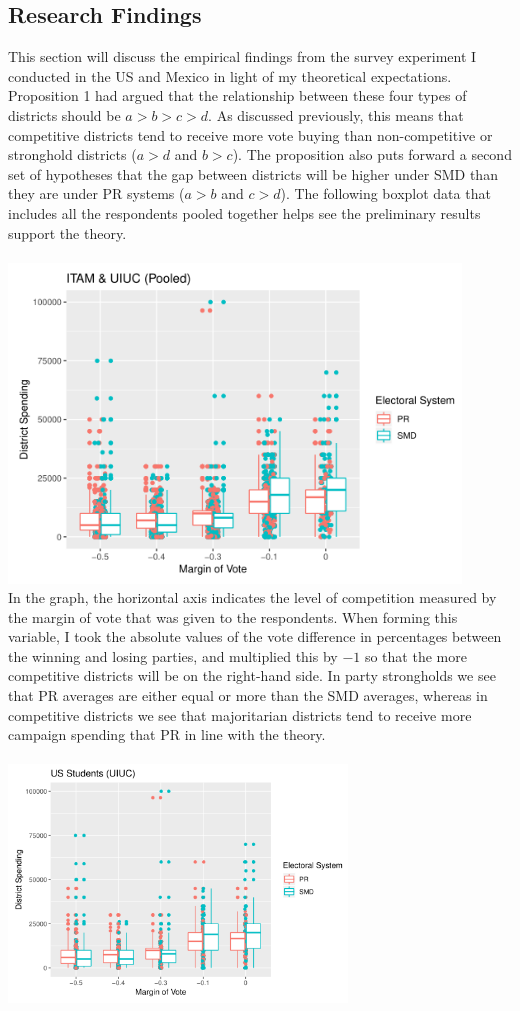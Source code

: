 \documentclass{article}
\begin{document}
\subsection{Research Findings}
This section will discuss the empirical findings from the survey experiment I conducted in the US and Mexico in light of my theoretical expectations. Proposition 1 had argued that the relationship between these four types of districts should be $a>b>c>d$. As discussed previously, this means that competitive districts tend to receive more vote buying than non-competitive or stronghold districts ($a>d$ and $b>c$). The proposition also puts forward a second set of hypotheses that the gap between districts will be higher under SMD than they are under PR systems ($a>b$ and $c>d$). The following boxplot data that includes all the respondents pooled together helps see the preliminary results  support the theory.\\
\\
\includegraphics[width=120mm]{Boxplot_Pooled}
\\
In the graph, the horizontal axis indicates the level of competition measured by the margin of vote that was given to the respondents. When forming this variable, I took the absolute values of the vote difference in percentages between the winning and losing parties, and multiplied this by $-1$ so that the more competitive districts will be on the right-hand side. In party strongholds we see that PR averages are either equal or more than the SMD averages, whereas in competitive districts we see that majoritarian districts tend to receive more campaign spending that PR in line with the theory.\\
\\
\includegraphics[width=90mm]{Boxplot_UIUC}
\end{document}
